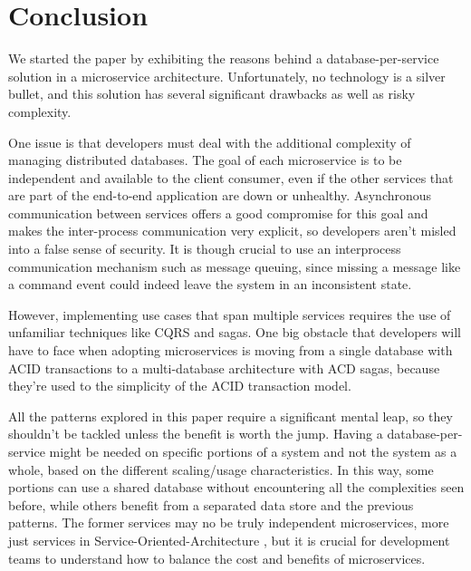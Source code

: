 \documentclass[conference]{IEEEtran}
\begin{document}
\section{Conclusion}

We started the paper by exhibiting the reasons behind a database-per-service solution in a microservice architecture. Unfortunately, no technology is a silver bullet, and this solution has several significant drawbacks as well as risky complexity.

One issue is that developers must deal with the additional complexity of managing distributed databases. The goal of each microservice is to be independent and available to the client consumer, even if the other services that are part of the end-to-end application are down or unhealthy. Asynchronous communication between services offers a good compromise for this goal and makes the inter-process communication very explicit, so developers aren't misled into a false sense of security. It is though crucial to use an interprocess communication mechanism such as message queuing, since missing a message like a command event could indeed leave the system in an inconsistent state. 

However, implementing use cases that span multiple services requires the use of unfamiliar techniques like CQRS and sagas. One big obstacle that developers will have to face when adopting microservices is moving from a single database with ACID transactions to a multi-database architecture with ACD sagas, because they're used to the simplicity of the ACID transaction model.

All the patterns explored in this paper require a significant mental leap, so they shouldn't be tackled unless the benefit is worth the jump. Having a database-per-service might be needed on specific portions of a system and not the system as a whole, based on the different scaling/usage characteristics. In this way, some portions can use a shared database without encountering all the complexities seen before, while others benefit from a separated data store and the previous patterns. The former services may no be truly independent microservices, more just services in Service-Oriented-Architecture \cite{soa}, but it is crucial for development teams to understand how to balance the cost and benefits of microservices. 






\end{document}
